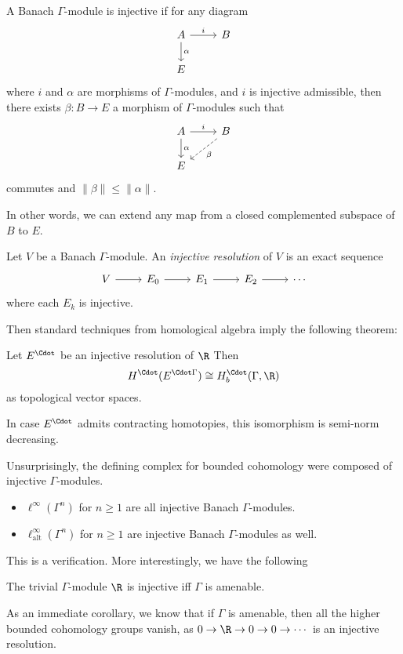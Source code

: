 \documentclass[a4paper]{article}
\begin{document}
\begin{defi}
  A Banach $\Gamma$-module is injective if for any diagram
  \[
    \begin{tikzcd}
      A \ar[r, "i"] \ar[d, "\alpha"] & B\\
      E
    \end{tikzcd}
  \]
  where $i$ and $\alpha$ are morphisms of $\Gamma$-modules, and $i$ is injective admissible, then there exists $\beta : B \to E$ a morphism of $\Gamma$-modules such that
  \[
    \begin{tikzcd}
      A \ar[r, "i"] \ar[d, "\alpha"] & B \ar[ld, dashed, "\beta"]\\
      E
    \end{tikzcd}
  \]
  commutes and $\|\beta\| \leq \|\alpha\|$.
\end{defi}
In other words, we can extend any map from a closed complemented subspace of $B$ to $E$.

\begin{defi}
  Let $V$ be a Banach $\Gamma$-module. An \emph{injective resolution} of $V$ is an exact sequence
  \[
    \begin{tikzcd}
      V \ar[r] & E_0 \ar[r] & E_1 \ar[r] & E_2 \ar[r] & \cdots
    \end{tikzcd}
  \]
  where each $E_k$ is injective.
\end{defi}
Then standard techniques from homological algebra imply the following theorem:
\begin{thm}
  Let $E^{\Cdot}$ be an injective resolution of $\R$ Then
  \[
    H^\Cdot(E^{\Cdot \Gamma}) \cong H_b^\Cdot(\Gamma, \R)
  \]
  as topological vector spaces.

  In case $E^\Cdot$ admits contracting homotopies, this isomorphism is semi-norm decreasing.
\end{thm}

Unsurprisingly, the defining complex for bounded cohomology were composed of injective $\Gamma$-modules.
\begin{lemma}\leavevmode
  \begin{itemize}
    \item $\ell^\infty(\Gamma^n)$ for $n \geq 1$ are all injective Banach $\Gamma$-modules.
    \item $\ell_{\mathrm{alt}}^\infty(\Gamma^n)$ for $n \geq 1$ are injective Banach $\Gamma$-modules as well.
  \end{itemize}
\end{lemma}
This is a verification. More interestingly, we have the following
\begin{prop}
  The trivial $\Gamma$-module $\R$ is injective iff $\Gamma$ is amenable.
\end{prop}
As an immediate corollary, we know that if $\Gamma$ is amenable, then all the higher bounded cohomology groups vanish, as $0 \to \R \to 0 \to 0 \to \cdots$ is an injective resolution.
\end{document}
